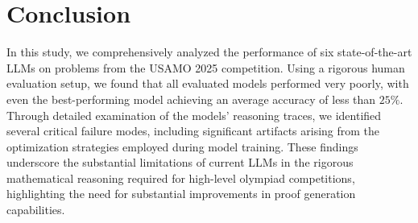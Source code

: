 \section{Conclusion}\label{sec:conclusion}

In this study, we comprehensively analyzed the performance of six state-of-the-art LLMs on problems from the USAMO 2025 competition. Using a rigorous human evaluation setup, we found that all evaluated models performed very poorly, with even the best-performing model achieving an average accuracy of less than $25\%$. Through detailed examination of the models' reasoning traces, we identified several critical failure modes, including significant artifacts arising from the optimization strategies employed during model training. These findings underscore the substantial limitations of current LLMs in the rigorous mathematical reasoning required for high-level olympiad competitions, highlighting the need for substantial improvements in  proof generation capabilities.